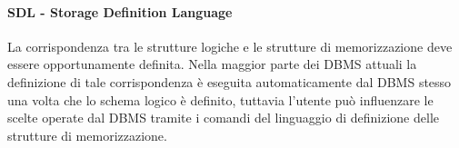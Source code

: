 \paragraph{SDL - Storage Definition Language}%
\label{par:SDL - Storage Definition Language}
La corrispondenza tra le strutture logiche e le strutture di memorizzazione deve
essere opportunamente definita.
Nella maggior parte dei DBMS attuali la definizione di tale corrispondenza è
eseguita automaticamente dal DBMS stesso una volta che lo schema logico è
definito, tuttavia l'utente può influenzare le scelte operate dal DBMS tramite i
comandi del linguaggio di definizione delle strutture di memorizzazione.
